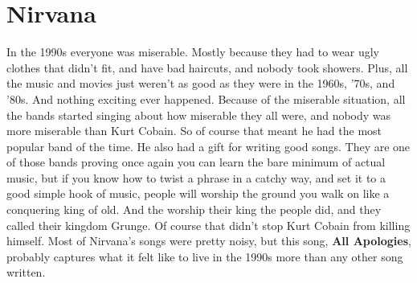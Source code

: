 \documentclass[letterpaper,single]{article}
\begin{document}
\section{Nirvana}
In the 1990s everyone was miserable. Mostly because they had to wear
ugly clothes that didn't fit, and have bad haircuts, and nobody took
showers. Plus, all the music and movies just weren't as good as they
were in the 1960s, '70s, and '80s. And nothing exciting ever happened.
Because of the miserable situation, all the bands started singing about
how miserable they all were, and nobody was more miserable than Kurt
Cobain. So of course that meant he had the most popular band of the
time. He also had a gift for writing good songs. They are one of those
bands proving once again you can learn the bare minimum of actual music,
but if you know how to twist a phrase in a catchy way, and set it to a
good simple hook of music, people will worship the ground you walk on
like a conquering king of old. And the worship their king the people
did, and they called their kingdom Grunge. Of course that didn't stop
Kurt Cobain from killing himself. Most of Nirvana's songs were pretty
noisy, but this song, \textbf{All Apologies}, probably captures what it
felt like to live in the 1990s more than any other song written.
\end{document}
